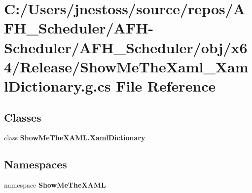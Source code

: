 \section{C\+:/\+Users/jnestoss/source/repos/\+A\+F\+H\+\_\+\+Scheduler/\+A\+F\+H-\/\+Scheduler/\+A\+F\+H\+\_\+\+Scheduler/obj/x64/\+Release/\+Show\+Me\+The\+Xaml\+\_\+\+Xaml\+Dictionary.g.\+cs File Reference}
\label{x64_2_release_2_show_me_the_xaml___xaml_dictionary_8g_8cs}
\subsection*{Classes}
\begin{DoxyCompactItemize}
\item 
class {\bfseries Show\+Me\+The\+X\+A\+M\+L.\+Xaml\+Dictionary}
\end{DoxyCompactItemize}
\subsection*{Namespaces}
\begin{DoxyCompactItemize}
\item 
namespace \textbf{ Show\+Me\+The\+X\+A\+ML}
\end{DoxyCompactItemize}
